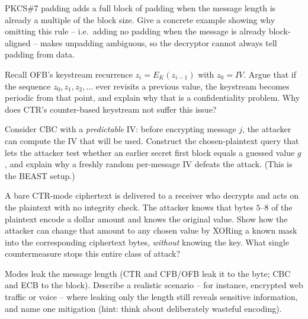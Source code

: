 \begin{exercise}
PKCS\#7 padding adds a full block of padding when the message length is already a multiple of the block size. Give a concrete example showing why omitting this rule -- i.e.\ adding no padding when the message is already block-aligned -- makes unpadding ambiguous, so the decryptor cannot always tell padding from data.
\end{exercise}

\begin{exercise}
Recall OFB's keystream recurrence $z_i = E_K(z_{i-1})$ with $z_0 = \mathit{IV}$. Argue that if the sequence $z_0, z_1, z_2, \dots$ ever revisits a previous value, the keystream becomes periodic from that point, and explain why that is a confidentiality problem. Why does CTR's counter-based keystream not suffer this issue?
\end{exercise}

\begin{exercise}
Consider CBC with a \emph{predictable} IV: before encrypting message $j$, the attacker can compute the IV that will be used. Construct the chosen-plaintext query that lets the attacker test whether an earlier secret first block equals a guessed value $g$, and explain why a freshly random per-message IV defeats the attack. (This is the BEAST setup.)
\end{exercise}

\begin{exercise}
A bare CTR-mode ciphertext is delivered to a receiver who decrypts and acts on the plaintext with no integrity check. The attacker knows that bytes $5$--$8$ of the plaintext encode a dollar amount and knows the original value. Show how the attacker can change that amount to any chosen value by XORing a known mask into the corresponding ciphertext bytes, \emph{without} knowing the key. What single countermeasure stops this entire class of attack?
\end{exercise}

\begin{exercise}
Modes leak the message length (CTR and CFB/OFB leak it to the byte; CBC and ECB to the block). Describe a realistic scenario -- for instance, encrypted web traffic or voice -- where leaking only the length still reveals sensitive information, and name one mitigation (hint: think about deliberately wasteful encoding).
\end{exercise}
